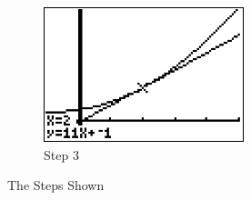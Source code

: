 \begin{figure}
\begin{subfigure}[b]{0.3\textwidth}
        \includegraphics[width=\textwidth]{./assets/20170509-123642.png}
        \caption{Step 3}
        \label{fig:step3}
    \end{subfigure}
    \caption{The Steps Shown}\label{fig:threesteps}
\end{figure}